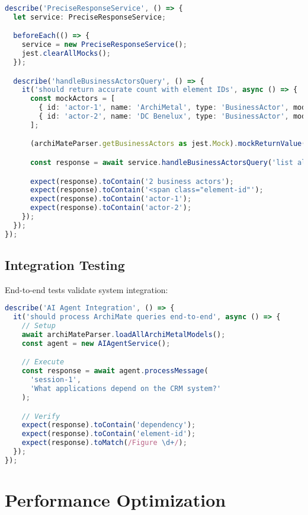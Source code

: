 \documentclass[12pt,a4paper]{report}
\begin{document}
\begin{lstlisting}[language=TypeScript, caption=Unit Test Example]
describe('PreciseResponseService', () => {
  let service: PreciseResponseService;

  beforeEach(() => {
    service = new PreciseResponseService();
    jest.clearAllMocks();
  });

  describe('handleBusinessActorsQuery', () => {
    it('should return accurate count with element IDs', async () => {
      const mockActors = [
        { id: 'actor-1', name: 'ArchiMetal', type: 'BusinessActor', model: 'test' },
        { id: 'actor-2', name: 'DC Benelux', type: 'BusinessActor', model: 'test' }
      ];

      (archiMateParser.getBusinessActors as jest.Mock).mockReturnValue(mockActors);

      const response = await service.handleBusinessActorsQuery('list all business actors');

      expect(response).toContain('2 business actors');
      expect(response).toContain('<span class="element-id"');
      expect(response).toContain('actor-1');
      expect(response).toContain('actor-2');
    });
  });
});
\end{lstlisting}

\subsection{Integration Testing}

End-to-end tests validate system integration:

\begin{lstlisting}[language=TypeScript, caption=Integration Test]
describe('AI Agent Integration', () => {
  it('should process ArchiMate queries end-to-end', async () => {
    // Setup
    await archiMateParser.loadAllArchiMetalModels();
    const agent = new AIAgentService();

    // Execute
    const response = await agent.processMessage(
      'session-1',
      'What applications depend on the CRM system?'
    );

    // Verify
    expect(response).toContain('dependency');
    expect(response).toContain('element-id');
    expect(response).toMatch(/Figure \d+/);
  });
});
\end{lstlisting}

\section{Performance Optimization}
\end{document}
